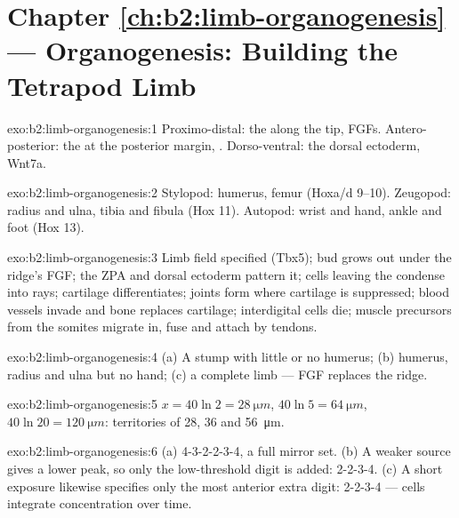 \section*{Chapter \ref{ch:b2:limb-organogenesis} --- Organogenesis: Building the Tetrapod Limb}

\begin{solution}{exo:b2:limb-organogenesis:1}
Proximo-distal: the  along the tip, FGFs.
Antero-posterior: the  at the posterior
margin, . Dorso-ventral: the dorsal ectoderm, Wnt7a.
\end{solution}

\begin{solution}{exo:b2:limb-organogenesis:2}
Stylopod: humerus, femur (Hoxa/d 9--10). Zeugopod: radius and ulna,
tibia and fibula (Hox 11). Autopod: wrist and hand, ankle and foot
(Hox 13).
\end{solution}

\begin{solution}{exo:b2:limb-organogenesis:3}
Limb field specified (Tbx5); bud grows out under the ridge's FGF;
the ZPA and dorsal ectoderm pattern it; cells leaving the  condense into rays; cartilage differentiates; joints form
where cartilage is suppressed; blood vessels invade and bone
replaces cartilage; interdigital cells die; muscle precursors from
the somites migrate in, fuse and attach by tendons.
\end{solution}

\begin{solution}{exo:b2:limb-organogenesis:4}
(a) A stump with little or no humerus; (b) humerus, radius and ulna
but no hand; (c) a complete limb --- FGF replaces the ridge.
\end{solution}

\begin{solution}{exo:b2:limb-organogenesis:5}
$x = 40\ln 2 = \qty{28}{\micro m}$, $40\ln 5 = \qty{64}{\micro m}$,
$40\ln 20 = \qty{120}{\micro m}$: territories of 28, 36 and
\qty{56}{\micro m}.
\end{solution}

\begin{solution}{exo:b2:limb-organogenesis:6}
(a) 4-3-2-2-3-4, a full mirror set. (b) A weaker source gives a
lower peak, so only the low-threshold digit is added: 2-2-3-4. (c)
A short exposure likewise specifies only the most anterior extra
digit: 2-2-3-4 --- cells integrate concentration over time.
\end{solution}

